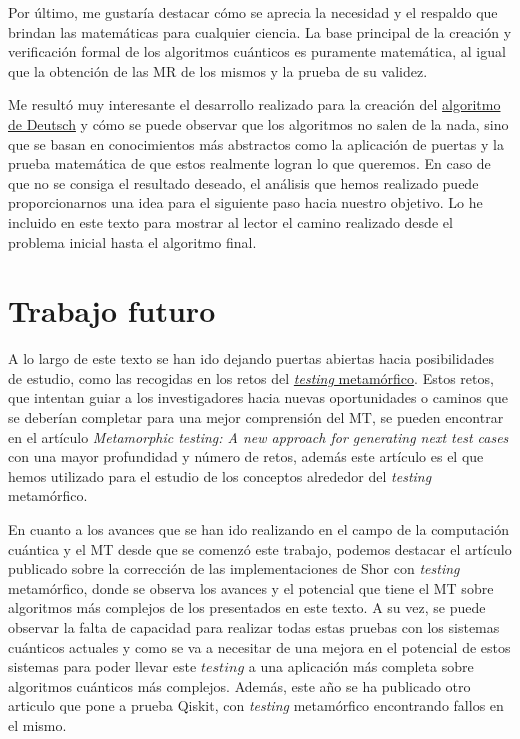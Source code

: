 Por último, me gustaría destacar cómo se aprecia la necesidad y el respaldo que brindan las matemáticas para cualquier ciencia. La base principal de la creación y verificación formal de los algoritmos cuánticos es puramente matemática, al igual que la obtención de las MR de los mismos y la prueba de su validez.\newline

Me resultó muy interesante el desarrollo realizado para la creación del \hyperref[Sec3.2:Deutsch]{algoritmo de Deutsch} y cómo se puede observar que los algoritmos no salen de la nada, sino que se basan en conocimientos más abstractos como la aplicación de puertas y la prueba matemática de que estos realmente logran lo que queremos. En caso de que no se consiga el resultado deseado, el análisis que hemos realizado puede proporcionarnos una idea para el siguiente paso hacia nuestro objetivo. Lo he incluido en este texto para mostrar al lector el camino realizado desde el problema inicial hasta el algoritmo final.

\section{Trabajo futuro}
\label{Sec5.2:Futuro}

A lo largo de este texto se han ido dejando puertas abiertas hacia posibilidades de estudio, como las recogidas en los retos del \hyperref[Sec2.4:Metamorfico]{\textit{testing} metamórfico}. Estos retos, que intentan guiar a los investigadores hacia nuevas oportunidades o caminos que se deberían completar para una mejor comprensión del MT, se pueden encontrar en el artículo \textit{Metamorphic testing: A new approach for generating next test cases}\cite{AR:MTmain:2008} con una mayor profundidad y número de retos, además este artículo es el que hemos utilizado para el estudio de los conceptos alrededor del \textit{testing} metamórfico.\newline

En cuanto a los avances que se han ido realizando en el campo de la computación cuántica y el MT desde que se comenzó este trabajo, podemos destacar el artículo publicado sobre la corrección de las implementaciones de Shor con \textit{testing} metamórfico\cite{metamorphicShor:2022}, donde se observa los avances y el potencial que tiene el MT sobre algoritmos más complejos de los presentados en este texto. A su vez, se puede observar la falta de capacidad para realizar todas estas pruebas con los sistemas cuánticos actuales y como se va a necesitar de una mejora en el potencial de estos sistemas para poder llevar este $testing$ a una aplicación más completa sobre algoritmos cuánticos más complejos. Además, este año se ha publicado otro articulo que pone a prueba Qiskit, con \textit{testing} metamórfico\cite{AR:QiskitMT:2023} encontrando fallos en el mismo.\newline

